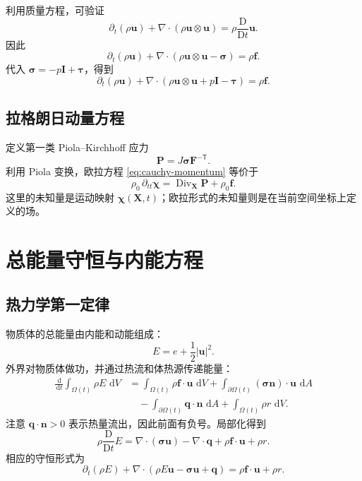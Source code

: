 \documentclass[cn,hazy,blue,11pt,normal]{elegantnote}
\numberwithin{equation}{section}
\newcommand{\dd}{\,\mathrm d}
\newcommand{\Dt}{\frac{\mathrm D}{\mathrm Dt}}
\newcommand{\vct}[1]{\bm{#1}}
\newcommand{\ten}[1]{\bm{#1}}
\newcommand{\Div}{\operatorname{Div}}
\begin{document}
利用质量方程，可验证
\begin{equation}
 \partial_t(\rho\vct{u})+\nabla\cdot(\rho\vct{u}\otimes\vct{u})
 =\rho\Dt\vct{u}.
\end{equation}
因此
\begin{equation}
 \boxed{\partial_t(\rho\vct{u})
 +\nabla\cdot(\rho\vct{u}\otimes\vct{u}-\ten{\sigma})
 =\rho\vct{f}.} \label{eq:momentum-cons-general}
\end{equation}
代入 $\ten{\sigma}=-p\ten I+\ten\tau$，得到
\begin{equation}
 \partial_t(\rho\vct{u})
 +\nabla\cdot(\rho\vct{u}\otimes\vct{u}+p\ten I-\ten\tau)
 =\rho\vct{f}.
\end{equation}

\subsection{拉格朗日动量方程}

定义第一类 Piola--Kirchhoff 应力
\begin{equation}
 \ten P=J\ten\sigma\ten F^{-\mathsf T}.
\end{equation}
利用 Piola 变换，欧拉方程 \eqref{eq:cauchy-momentum} 等价于
\begin{equation}
 \boxed{\rho_0\,\partial_{tt}\vct\chi
 =\Div_{\vct X}\ten P+\rho_0\vct f.}
\end{equation}
这里的未知量是运动映射 $\vct\chi(\vct X,t)$；欧拉形式的未知量则是在当前空间坐标上定义的场。

\section{总能量守恒与内能方程}

\subsection{热力学第一定律}

物质体的总能量由内能和动能组成：
\begin{equation}
 E=e+\frac12|\vct{u}|^2.
\end{equation}
外界对物质体做功，并通过热流和体热源传递能量：
\begin{align}
 \frac{\dd}{\dd t}\int_{\Omega(t)}\rho E\,\dd V
 &=\int_{\Omega(t)}\rho\vct f\cdot\vct u\,\dd V
 +\int_{\partial\Omega(t)}(\ten\sigma\vct n)\cdot\vct u\,\dd A \\
 &\quad-\int_{\partial\Omega(t)}\vct q\cdot\vct n\,\dd A
 +\int_{\Omega(t)}\rho r\,\dd V.
\end{align}
注意 $\vct q\cdot\vct n>0$ 表示热量流出，因此前面有负号。局部化得到
\begin{equation}
 \boxed{\rho\Dt E
 =\nabla\cdot(\ten\sigma\vct u)-\nabla\cdot\vct q
 +\rho\vct f\cdot\vct u+\rho r.} \label{eq:total-energy-material}
\end{equation}
相应的守恒形式为
\begin{equation}
 \boxed{\partial_t(\rho E)
 +\nabla\cdot\left(\rho E\vct u-\ten\sigma\vct u+\vct q\right)
 =\rho\vct f\cdot\vct u+\rho r.} \label{eq:total-energy-cons}
\end{equation}
\end{document}
